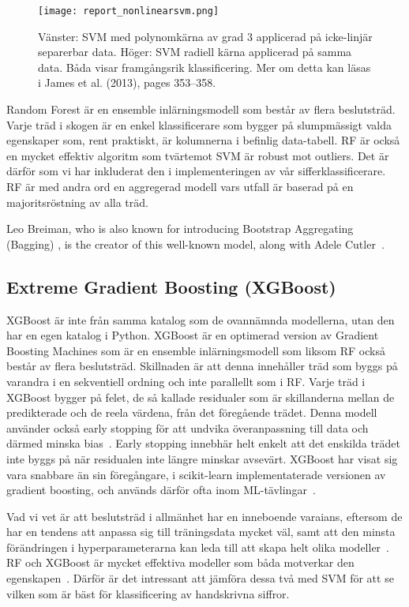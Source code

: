\documentclass[12pt,a4paper]{article}
\begin{document}
\begin{figure}[b]
  \centering
  \texttt{[image: report\_nonlinearsvm.png]}
  \caption{\footnotesize{Vänster: SVM med polynomkärna av grad 3 applicerad på icke-linjär separerbar data. Höger: SVM radiell kärna applicerad på samma data. Båda visar framgångsrik klassificering. Mer om detta kan läsas i James et al. (2013), pages 353--358.}}\label{fig:nonlinearsvm}
\end{figure}

Random Forest är en ensemble inlärningsmodell som består av flera beslutsträd. Varje träd i skogen är en enkel klassificerare som bygger på slumpmässigt valda egenskaper som, rent praktiskt, är kolumnerna i befinlig data-tabell. RF är också en mycket effektiv algoritm som tvärtemot SVM är robust mot outliers. Det är därför som vi har inkluderat den i implementeringen av vår sifferklassificerare. RF är med andra ord en aggregerad modell vars utfall är baserad på en majoritsröstning av alla träd.

Leo Breiman, who is also known for introducing Bootstrap Aggregating (Bagging) \citep{Geron}, is the creator of this well-known model, along with Adele Cutler~\citep{Izenman}.

\subsection{Extreme Gradient Boosting (XGBoost)}

XGBoost är inte från samma katalog som de ovannämnda modellerna, utan den har en egen katalog i Python. XGBoost är en optimerad version av Gradient Boosting Machines som är en ensemble inlärningsmodell som liksom RF också består av flera beslutsträd. Skillnaden är att denna innehåller träd som byggs på varandra i en sekventiell ordning och inte parallellt som i RF. Varje träd i XGBoost bygger på felet, de så kallade residualer som är skillanderna mellan de predikterade och de reela värdena, från det föregående trädet. Denna modell använder också early stopping för att undvika överanpassning till data och därmed minska bias~\citep{Geron}. Early stopping innebhär helt enkelt att det enskilda trädet inte byggs på när residualen inte längre minskar avsevärt. XGBoost har visat sig vara snabbare än sin föregångare, i scikit-learn implementaterade versionen av gradient boosting, och används därför ofta inom ML-tävlingar~\citep{Guido}.

Vad vi vet är att beslutsträd i allmänhet har en inneboende varaians, eftersom de har en tendens att anpassa sig till träningsdata mycket väl, samt att den minsta förändringen i hyperparameterarna kan leda till att skapa helt olika modeller~\citep{Geron}. RF och XGBoost är mycket effektiva modeller som båda motverkar den egenskapen~\citep{Geron}. Därför är det intressant att jämföra dessa två med SVM för att se vilken som är bäst för klassificering av handskrivna siffror.
\end{document}
